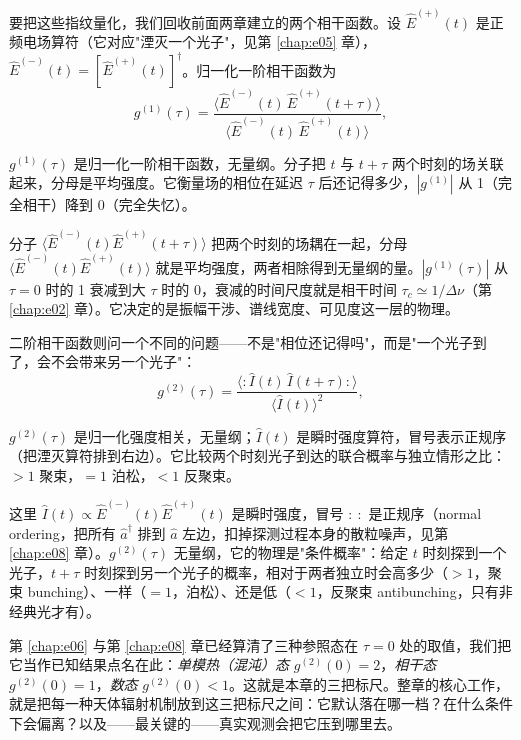 要把这些指纹量化，我们回收前面两章建立的两个相干函数。设 \(\hat E^{(+)}(t)\) 是正频电场算符（它对应"湮灭一个光子"，见第 \ref{chap:e05} 章），\(\hat E^{(-)}(t)=[\hat E^{(+)}(t)]^\dagger\)。归一化一阶相干函数为
\begin{equation}
  g^{(1)}(\tau)=
  \frac{\langle \hat E^{(-)}(t)\,\hat E^{(+)}(t+\tau)\rangle}
       {\langle \hat E^{(-)}(t)\,\hat E^{(+)}(t)\rangle},
  \label{eq:e16-g1}
\end{equation}
\begin{formulaexplain}
\(g^{(1)}(\tau)\) 是归一化一阶相干函数，无量纲。分子把 \(t\) 与 \(t+\tau\) 两个时刻的场关联起来，分母是平均强度。它衡量场的相位在延迟 \(\tau\) 后还记得多少，\(|g^{(1)}|\) 从 1（完全相干）降到 0（完全失忆）。
\end{formulaexplain}
分子 \(\langle \hat E^{(-)}(t)\hat E^{(+)}(t+\tau)\rangle\) 把两个时刻的场耦在一起，分母 \(\langle \hat E^{(-)}(t)\hat E^{(+)}(t)\rangle\) 就是平均强度，两者相除得到无量纲的量。\(|g^{(1)}(\tau)|\) 从 \(\tau=0\) 时的 1 衰减到大 \(\tau\) 时的 0，衰减的时间尺度就是相干时间 \(\tau_c\simeq1/\Delta\nu\)（第 \ref{chap:e02} 章）。它决定的是振幅干涉、谱线宽度、可见度这一层的物理。

二阶相干函数则问一个不同的问题——不是"相位还记得吗"，而是"一个光子到了，会不会带来另一个光子"：
\begin{equation}
  g^{(2)}(\tau)=
  \frac{\langle :\!\hat I(t)\,\hat I(t+\tau)\!:\rangle}{\langle \hat I(t)\rangle^2},
  \label{eq:e16-g2}
\end{equation}
\begin{formulaexplain}
\(g^{(2)}(\tau)\) 是归一化强度相关，无量纲；\(\hat I(t)\) 是瞬时强度算符，冒号表示正规序（把湮灭算符排到右边）。它比较两个时刻光子到达的联合概率与独立情形之比：\(>1\) 聚束，\(=1\) 泊松，\(<1\) 反聚束。
\end{formulaexplain}
这里 \(\hat I(t)\propto\hat E^{(-)}(t)\hat E^{(+)}(t)\) 是瞬时强度，冒号 \(:\ :\) 是正规序（normal ordering，把所有 \(\hat a^\dagger\) 排到 \(\hat a\) 左边，扣掉探测过程本身的散粒噪声，见第 \ref{chap:e08} 章）。\(g^{(2)}(\tau)\) 无量纲，它的物理是"条件概率"：给定 \(t\) 时刻探到一个光子，\(t+\tau\) 时刻探到另一个光子的概率，相对于两者独立时会高多少（\(>1\)，聚束 bunching）、一样（\(=1\)，泊松）、还是低（\(<1\)，反聚束 antibunching，只有非经典光才有）。

第 \ref{chap:e06} 与第 \ref{chap:e08} 章已经算清了三种参照态在 \(\tau=0\) 处的取值，我们把它当作已知结果点名在此：\emph{单模热（混沌）态} \(g^{(2)}(0)=2\)，\emph{相干态} \(g^{(2)}(0)=1\)，\emph{数态} \(g^{(2)}(0)<1\)。这就是本章的三把标尺。整章的核心工作，就是把每一种天体辐射机制放到这三把标尺之间：它默认落在哪一档？在什么条件下会偏离？以及——最关键的——真实观测会把它压到哪里去。


